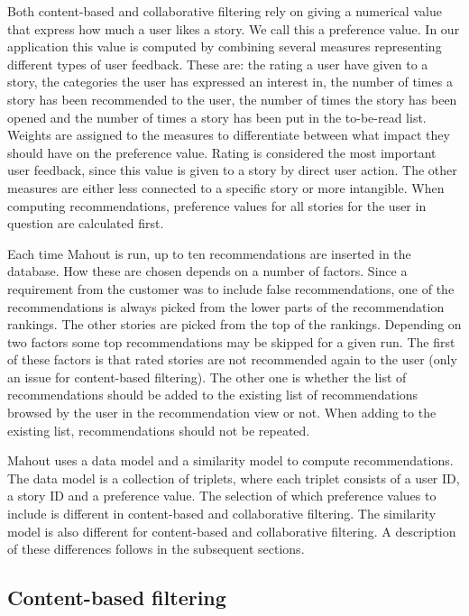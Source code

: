 Both content-based and collaborative filtering rely on giving a numerical value that express how much a user likes a story. We call this a preference value. In our application this value is computed by combining several measures representing different types of user feedback. These are: the rating a user have given to a story, the categories the user has expressed an interest in, the number of times a story has been recommended to the user, the number of times the story has been opened and the number of times a story has been put in the to-be-read list. Weights are assigned to the measures to differentiate between what impact they should have on the preference value. Rating is considered the most important user feedback, since this value is given to a story by direct user action. The other measures are either less connected to a specific story or more intangible. When computing recommendations, preference values for all stories for the user in question are calculated first.\newline

Each time Mahout is run, up to ten recommendations are inserted in the database. How these are chosen depends on a number of factors. Since a requirement from the customer was to include false recommendations, one of the recommendations is always picked from the lower parts of the recommendation rankings. The other stories are picked from the top of the rankings. Depending on two factors some top recommendations may be skipped for a given run. The first of these factors is that rated stories are not recommended again to the user (only an issue for content-based filtering). The other one is whether the list of recommendations should be added to the existing list of recommendations browsed by the user in the recommendation view or not. When adding to the existing list, recommendations should not be repeated.\newline

Mahout uses a data model and a similarity model to compute recommendations. The data model is a collection of triplets, where each triplet consists of a user ID, a story ID and a preference value. The selection of which preference values to include is different in content-based and collaborative filtering. The similarity model is also different for content-based and collaborative filtering. A description of these differences follows in the subsequent sections.    

\subsection{Content-based filtering}

